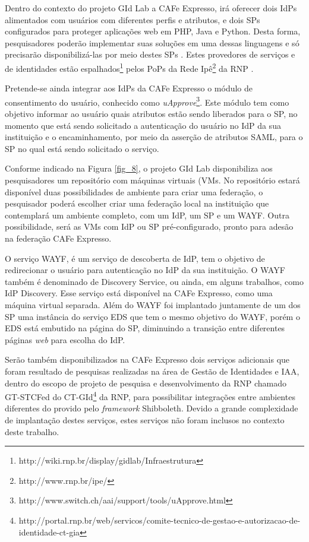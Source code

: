 Dentro do contexto do projeto GId Lab a CAFe Expresso, irá oferecer dois IdPs alimentados com usuários com diferentes perfis e atributos, e dois SPs configurados para proteger aplicações web em PHP, Java e Python. Desta forma, pesquisadores poderão implementar suas soluções em uma dessas linguagens e só precisarão disponibilizá-las por meio destes SPs \cite{wangham:13}. Estes provedores de serviços e de identidades estão espalhados\footnote{http://wiki.rnp.br/display/gidlab/Infraestrutura} pelos \acp{PoP} da Rede Ipê\footnote{http://www.rnp.br/ipe/} da RNP \cite{wangham:13}.

Pretende-se ainda integrar aos IdPs da CAFe Expresso o módulo de consentimento do usuário, conhecido como \textit{uApprove}\footnote{http://www.switch.ch/aai/support/tools/uApprove.html}. Este módulo tem como objetivo informar ao usuário quais atributos estão sendo liberados para o SP, no momento que está sendo solicitado a autenticação do usuário no IdP da sua instituição e o encaminhamento, por meio da asserção de atributos SAML, para o SP no qual está sendo solicitado o serviço.

Conforme indicado na Figura \ref{fig_8}, o projeto GId Lab disponibiliza aos pesquisadores um repositório com máquinas virtuais (\acp{VM}. No repositório estará disponível duas possibilidades de ambiente para criar uma federação, o pesquisador poderá escolher criar uma federação local na instituição que contemplará um ambiente completo, com um IdP, um SP e um WAYF. Outra possibilidade, será as VMs com IdP ou SP pré-configurado, pronto para adesão na federação CAFe Expresso.

O serviço \acf{WAYF}, é um serviço de descoberta de IdP, tem o objetivo de redirecionar o usuário para autenticação no IdP da sua instituição. O WAYF também é denominado de Discovery Service, ou ainda, em alguns trabalhos, como IdP Discovery. Esse serviço está disponível na CAFe Expresso, como uma máquina virtual separada. Além do WAYF foi implantado juntamente de um dos SP uma instância do serviço \acf{EDS} que tem o mesmo objetivo do \ac{WAYF}, porém o EDS está embutido na página do SP, diminuindo a transição entre diferentes páginas \textit{web} para escolha do IdP.

Serão também disponibilizados na CAFe Expresso dois serviços adicionais que foram resultado de pesquisas realizadas na área de Gestão de Identidades e IAA, dentro do escopo de projeto de pesquisa e desenvolvimento da RNP chamado \ac{GT-STCFed} do \ac{CT-GId}\footnote{http://portal.rnp.br/web/servicos/comite-tecnico-de-gestao-e-autorizacao-de-identidade-ct-gia} da RNP, para possibilitar integrações entre ambientes diferentes do provido pelo \textit{framework} Shibboleth. Devido a grande complexidade de implantação destes serviços, estes serviços não foram inclusos no contexto deste trabalho.

